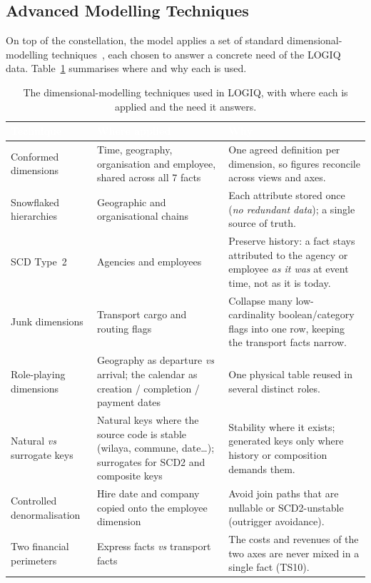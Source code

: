 \subsection{Advanced Modelling Techniques}
\label{subsec:ch4-dw-techniques}

On top of the constellation, the model applies a set of standard dimensional-modelling
techniques~\parencite{kimball2013}, each chosen to answer a concrete need of the LOGIQ data.
Table~\ref{tab:ch4-dw-techniques} summarises where and why each is used.

\begin{table}[H]
\centering
\caption{The dimensional-modelling techniques used in LOGIQ, with where each is applied and the need it
answers.}
\label{tab:ch4-dw-techniques}
\renewcommand{\arraystretch}{1.35}
\begin{tabularx}{\linewidth}{|>{\raggedright\arraybackslash}p{3.3cm}|>{\raggedright\arraybackslash}p{4.0cm}|>{\raggedright\arraybackslash}X|}
\hline
\rowcolor{tblheader}
\textcolor{white}{\textbf{Technique}} & \textcolor{white}{\textbf{Where applied}} &
\textcolor{white}{\textbf{Why}} \\
\hline
Conformed dimensions & Time, geography, organisation and employee, shared across all 7 facts &
One agreed definition per dimension, so figures reconcile across views and axes. \\
Snowflaked hierarchies & Geographic and organisational chains & Each attribute stored once
(\emph{no redundant data}); a single source of truth. \\
SCD Type~2 & Agencies and employees & Preserve history: a fact stays attributed to the agency or
employee \emph{as it was} at event time, not as it is today. \\
Junk dimensions & Transport cargo and routing flags & Collapse many low-cardinality boolean/category
flags into one row, keeping the transport facts narrow. \\
Role-playing dimensions & Geography as departure \emph{vs} arrival; the calendar as creation /
completion / payment dates & One physical table reused in several distinct roles. \\
Natural \emph{vs} surrogate keys & Natural keys where the source code is stable (wilaya, commune,
date\dots); surrogates for SCD2 and composite keys & Stability where it exists; generated keys only
where history or composition demands them. \\
Controlled denormalisation & Hire date and company copied onto the employee dimension &
Avoid join paths that are nullable or SCD2-unstable (outrigger avoidance). \\
Two financial perimeters & Express facts \emph{vs} transport facts & The costs and revenues of the two
axes are never mixed in a single fact (TS10). \\
\hline
\end{tabularx}
\end{table}

